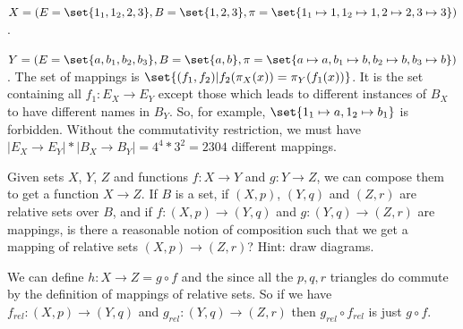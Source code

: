 \documentclass{article}
\begin{document}
\ans

\es $X = (E =
    \set{1_1,1_2,2,3}, B = \set{1, 2, 3}, \pi = \set{1_1 \mapsto 1, 1_2
    \mapsto 1, 2 \mapsto 2, 3 \mapsto 3})$.

    $Y = (E = \set{a, b_1, b_2, b_3}, B = \set{a,b}, \pi = \set{a \mapsto a, b_1
    \mapsto b, b_2 \mapsto b, b_3 \mapsto b})$.
\ei The set of mappings is $\set{(f_1, f_2) | f_2(\pi_X(x)) =
    \pi_Y(f_1(x))}$. It is the set containing all $f_1: E_X \to E_Y$ except
    those which leads to different instances of $B_X$ to have different names in
    $B_Y$. So, for example, $\set{1_1 \mapsto a, 1_2 \mapsto b_1}$ is forbidden.
\ei Without the commutativity restriction, we must have $|E_X \to E_Y| * |B_X
    \to B_Y| = 4^4 * 3^2 = 2304$ different mappings.
\ee


Given sets $X$, $Y$, $Z$ and functions $f : X \to Y$ and $g: Y \to Z$, we can
compose them to get a function $X \to Z$. If $B$ is a set, if $(X, p)$, $(Y,
q)$ and $(Z, r)$ are relative sets over $B$, and if $f : (X, p) \to (Y, q)$ and
$g: (Y, q) \to (Z, r)$ are mappings, is there a reasonable notion of composition
such that we get a mapping of relative sets $(X, p) \to (Z, r)$? Hint: draw
diagrams.

\ans

\begin{center}
\end{center}

We can define $h : X \to Z = g \circ f$ and the since all the $p,q,r$ triangles
do commute by the definition of mappings of relative sets. So if we have
$f_{rel} : (X,p) \to (Y,q)$ and $g_{rel} : (Y,q) \to (Z,r)$ then $g_{rel} \circ
f_{rel}$ is just $g \circ f$.
\end{document}
